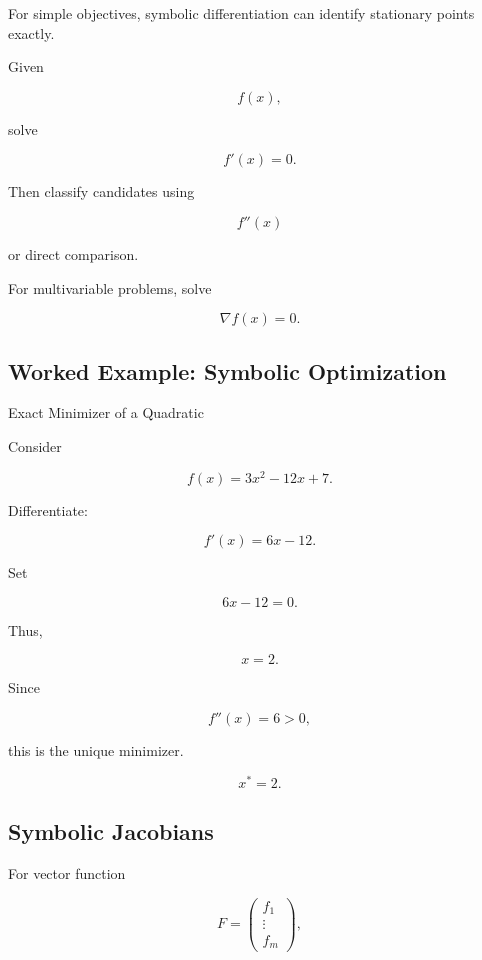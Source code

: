 For simple objectives, symbolic differentiation can identify stationary
points exactly.

Given

\[
f(x),
\]

solve

\[
\boxed{
f'(x)=0.
}
\]

Then classify candidates using

\[
\boxed{
f''(x)
}
\]

or direct comparison.

For multivariable problems, solve

\[
\boxed{
\nabla f(x)=0.
}
\]

\subsection{Worked Example: Symbolic Optimization}
\label{subsec:worked-symbolic-optimization}

\begin{workedexamplebox}{Exact Minimizer of a Quadratic}

Consider

\[
f(x)
=
3x^2-12x+7.
\]

Differentiate:

\[
f'(x)
=
6x-12.
\]

Set

\[
6x-12=0.
\]

Thus,

\[
x=2.
\]

Since

\[
f''(x)=6>0,
\]

this is the unique minimizer.

\begin{answerbox}
\[
\boxed{
x^*=2.
}
\]
\end{answerbox}

\end{workedexamplebox}

\subsection{Symbolic Jacobians}
\label{subsec:symbolic-jacobians}

For vector function

\[
F
=
\begin{pmatrix}
f_1\\
\vdots\\
f_m
\end{pmatrix},
\]

